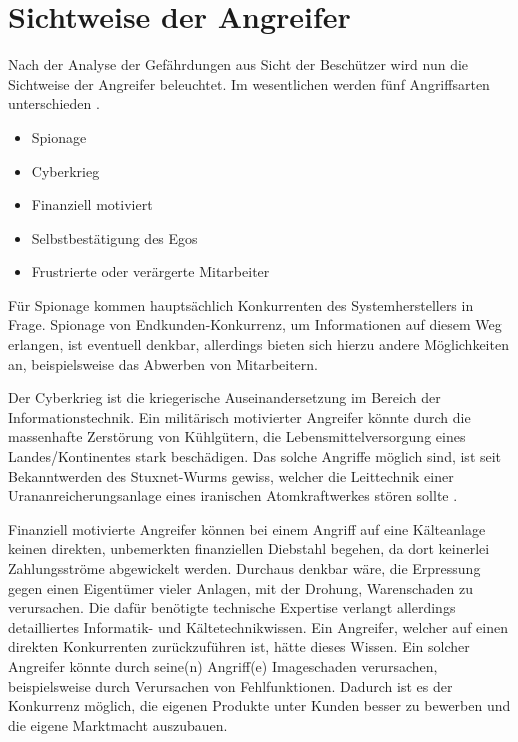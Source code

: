 \documentclass[11pt,a4paper]{report}
\begin{document}
\section{Sichtweise der Angreifer} \label{sec:attackers}

Nach der Analyse der Gefährdungen aus Sicht der Beschützer wird nun die Sichtweise der Angreifer beleuchtet. Im wesentlichen werden fünf Angriffsarten unterschieden \cite[s.~256]{gutmann}\cite{emp_sabo}\cite{wiki_cyberwar}.

\begin{itemize}[leftmargin=*]
\item Spionage
\item Cyberkrieg
\item Finanziell motiviert
\item Selbstbestätigung des Egos
\item Frustrierte oder verärgerte Mitarbeiter
\end{itemize}

Für Spionage kommen hauptsächlich Konkurrenten des Systemherstellers in Frage. Spionage von Endkunden-Konkurrenz, um Informationen auf diesem Weg erlangen, ist eventuell denkbar, allerdings bieten sich hierzu andere Möglichkeiten an, beispielsweise das Abwerben von Mitarbeitern. 

Der Cyberkrieg ist die kriegerische Auseinandersetzung im Bereich der Informationstechnik. Ein militärisch motivierter Angreifer könnte durch die massenhafte Zerstörung von Kühlgütern, die Lebensmittelversorgung eines Landes/Kontinentes stark beschädigen. Das solche Angriffe möglich sind, ist seit Bekanntwerden des Stuxnet-Wurms gewiss, welcher die Leittechnik einer Urananreicherungsanlage eines iranischen Atomkraftwerkes stören sollte \cite{wiki_stuxnet}.

Finanziell motivierte Angreifer können bei einem Angriff auf eine Kälteanlage keinen direkten, unbemerkten finanziellen Diebstahl begehen, da dort keinerlei Zahlungsströme abgewickelt werden. Durchaus denkbar wäre, die Erpressung gegen einen Eigentümer vieler Anlagen, mit der Drohung, Warenschaden zu verursachen. Die dafür benötigte technische Expertise verlangt allerdings detailliertes Informatik- und Kältetechnikwissen. Ein Angreifer, welcher auf einen direkten Konkurrenten zurückzuführen ist, hätte dieses Wissen. Ein solcher Angreifer könnte durch seine(n) Angriff(e) Imageschaden verursachen, beispielsweise durch Verursachen von Fehlfunktionen. Dadurch ist es der Konkurrenz möglich, die eigenen Produkte unter Kunden besser zu bewerben und die eigene Marktmacht auszubauen. 
\end{document}
